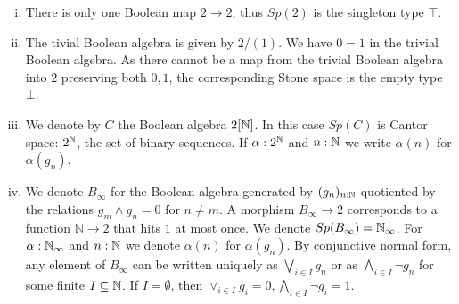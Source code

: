\begin{example}
  \label{boolean-algebra-examples}
  \begin{enumerate}[(i)]
  \item There is only one Boolean map $2\to 2$, thus $Sp(2)$ is the singleton type $\top$. 
  \item   
    The tivial Boolean algebra is given by $2/(1)$. 
    We have $0=1$ in the trivial Boolean algebra. 
    As there cannot be a map from the trivial Boolean algebra into $2$ preserving both $0,1$, 
    the corresponding Stone space is the empty type $\bot$.
  \item\label{ExampleBAunderCantor}   
    We denote by $C$ the Boolean algebra $2[\mathbb{N}]$.
    In this case $Sp(C)$ is Cantor space: $2^{\mathbb{N}}$, the set of binary sequences. 
    If $\alpha:2^{\mathbb{N}}$ and $n:\mathbb{N}$ we write $\alpha(n) $ for $\alpha(g_n)$. 
  \item\label{ExampleBAunderNinfty}
    We denote $B_\infty$ for the Boolean algebra generated by 
    $(g_n)_{n:\mathbb{N}}$ quotiented by the relations $g_m \wedge g_n = 0$ for ${n\neq m}$.
    A morphism $B_\infty\to 2$ corresponds to a function 
    $\mathbb N \to 2$ that hits $1$ at most once. 
    We denote $Sp(B_\infty) = \mathbb{N}_{\infty}$. 
    For $\alpha:\mathbb{N}_{\infty}$ and $n:\mathbb{N}$ we denote $\alpha(n)$ for $\alpha(g_n)$. 
  By conjunctive normal form, 
  any element of $B_\infty$ can be written uniquely as 
  $\bigvee_{i\in I} g_n$ or as $\bigwedge_{i\in I} \neg g_n$ for some finite $I\subseteq \mathbb{N}$. 
  If $I=\emptyset$, then $\vee_{i\in I} g_i = 0, \bigwedge_{i\in I} \neg g_i = 1$. 
  \end{enumerate}
\end{example}


